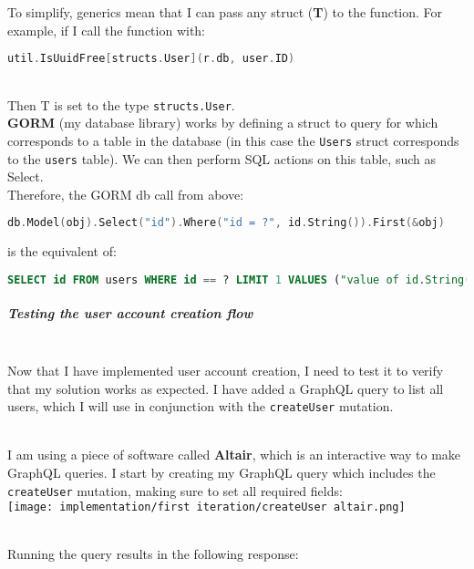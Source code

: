 \documentclass[../../main.tex]{subfiles}
\begin{document}
\noindent To simplify, generics mean that I can pass any struct (\textbf{T}) to the function.
For example, if I call the function with:\\

\begin{lstlisting}[language=Go]
        util.IsUuidFree[structs.User](r.db, user.ID)
    \end{lstlisting}

\noindent \\Then T is set to the type \lstinline{structs.User}.\\

\noindent \textbf{GORM} (my database library) works by defining a struct to query for which corresponds to a table in the database (in this case the \lstinline{Users} struct corresponds to the \lstinline{users} table). We can then perform SQL actions on this table, such as Select. \\

\noindent Therefore, the GORM db call from above:

\begin{lstlisting}[language=Go]
        db.Model(obj).Select("id").Where("id = ?", id.String()).First(&obj)
    \end{lstlisting}

\noindent is the equivalent of:

\begin{lstlisting}[language=SQL]
        SELECT id FROM users WHERE id == ? LIMIT 1 VALUES ("value of id.String()")
    \end{lstlisting}

\subparagraph{Testing the user account creation flow}

\noindent \\ Now that I have implemented user account creation, I need to test it to verify that my solution works as expected. I have added a GraphQL query to list all users, which I will use in conjunction with the \lstinline{createUser} mutation.

\noindent \\ I am using a piece of software called \textbf{Altair}, which is an interactive way to make GraphQL queries. I start by creating my GraphQL query which includes the \lstinline{createUser} mutation, making sure to set all required fields:\\

\texttt{[image: implementation/first iteration/createUser altair.png]}

\noindent \\ Running the query results in the following response:\\
\end{document}
